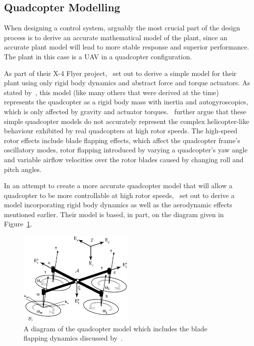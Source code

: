 \subsection{Quadcopter Modelling}

When designing a control system, arguably the most crucial part of the design process is to derive an accurate mathematical model of the plant, since an accurate plant model will lead to more stable response and superior performance. The plant in this case is a UAV in a quadcopter configuration. 

As part of their X-4 Flyer project,~\cite{hamel2002dynamic} set out to derive a simple model for their plant using only rigid body dynamics and abstract force and torque actuators. As stated by~\cite{Pounds2010c}, this model (like many others that were derived at the time) represents the quadcopter as a rigid body mass with inertia and autogyroscopics, which is only affected by gravity and actuator torques.~\citeauthor{Pounds2010c} further argue that these simple quadcopter models do not accurately represent the complex helicopter-like behaviour exhibited by real quadcopters at high rotor speeds. The high-speed rotor effects include blade flapping effects, which affect the quadcopter frame's oscillatory modes, rotor flapping introduced by varying a quadcopter's yaw angle and variable airflow velocities over the rotor blades caused by changing roll and pitch angles.

In an attempt to create a more accurate quadcopter model that will allow a quadcopter to be more controllable at high rotor speeds,~\citeauthor{Pounds2010c} set out to derive a model incorporating rigid body dynamics as well as the aerodynamic effects mentioned earlier. Their model is based, in part, on the diagram given in Figure~\ref{fig:chap2-quad-model}.

\begin{figure}
  \centering
  \includegraphics[width=0.5\textwidth]{figures/chapter2/pounds_quad-model.jpg}
  \caption[A diagram of the quadcopter model, including the blade flapping dynamics.]{A diagram of the quadcopter model which includes the blade flapping dynamics discussed by~\cite{Pounds2010c}.}
\label{fig:chap2-quad-model}
\end{figure}

